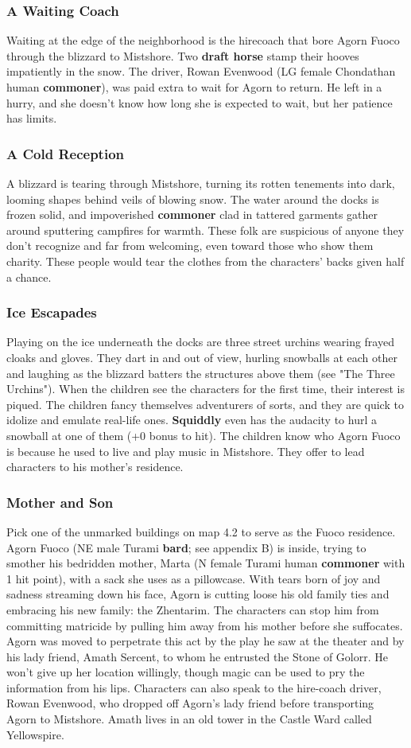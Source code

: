 \documentclass[10pt,a4paper,twoside,twocolumn,openany,nodeprecatedcode]{dndbook}
\begin{document}
\subsubsection{A Waiting Coach}
Waiting at the edge of the neighborhood is the hirecoach that bore Agorn Fuoco through the blizzard to Mistshore. Two \textbf{draft horse} stamp their hooves impatiently in the snow. The driver, Rowan Evenwood (LG female Chondathan human \textbf{commoner}), was paid extra to wait for Agorn to return. He left in a hurry, and she doesn't know how long she is expected to wait, but her patience has limits.
\subsubsection{A Cold Reception}
A blizzard is tearing through Mistshore, turning its rotten tenements into dark, looming shapes behind veils of blowing snow. The water around the docks is frozen solid, and impoverished \textbf{commoner} clad in tattered garments gather around sputtering campfires for warmth. These folk are suspicious of anyone they don't recognize and far from welcoming, even toward those who show them charity. These people would tear the clothes from the characters' backs given half a chance.
\subsubsection{Ice Escapades}
Playing on the ice underneath the docks are three street urchins wearing frayed cloaks and gloves. They dart in and out of view, hurling snowballs at each other and laughing as the blizzard batters the structures above them (see "The Three Urchins").
When the children see the characters for the first time, their interest is piqued. The children fancy themselves adventurers of sorts, and they are quick to idolize and emulate real-life ones. \textbf{Squiddly} even has the audacity to hurl a snowball at one of them (+0 bonus to hit). The children know who Agorn Fuoco is because he used to live and play music in Mistshore. They offer to lead characters to his mother's residence.
\subsubsection{Mother and Son}
Pick one of the unmarked buildings on map 4.2 to serve as the Fuoco residence. Agorn Fuoco (NE male Turami \textbf{bard}; see appendix B) is inside, trying to smother his bedridden mother, Marta (N female Turami human \textbf{commoner} with 1 hit point), with a sack she uses as a pillowcase. With tears born of joy and sadness streaming down his face, Agorn is cutting loose his old family ties and embracing his new family: the Zhentarim. The characters can stop him from committing matricide by pulling him away from his mother before she suffocates.
Agorn was moved to perpetrate this act by the play he saw at the theater and by his lady friend, Amath Sercent, to whom he entrusted the Stone of Golorr. He won't give up her location willingly, though magic can be used to pry the information from his lips. Characters can also speak to the hire-coach driver, Rowan Evenwood, who dropped off Agorn's lady friend before transporting Agorn to Mistshore. Amath lives in an old tower in the Castle Ward called Yellowspire.
\end{document}
